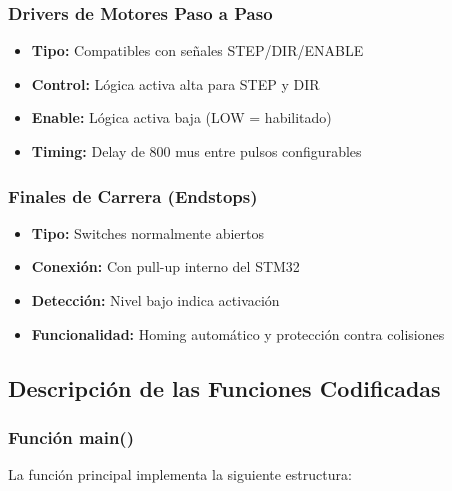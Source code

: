 \documentclass[12pt]{article}
\begin{document}
\subsubsection{Drivers de Motores Paso a Paso}
\begin{itemize}
    \item \textbf{Tipo:} Compatibles con señales STEP/DIR/ENABLE
    \item \textbf{Control:} Lógica activa alta para STEP y DIR
    \item \textbf{Enable:} Lógica activa baja (LOW = habilitado)
    \item \textbf{Timing:} Delay de 800 mus entre pulsos configurables
\end{itemize}

\subsubsection{Finales de Carrera (Endstops)}
\begin{itemize}
    \item \textbf{Tipo:} Switches normalmente abiertos
    \item \textbf{Conexión:} Con pull-up interno del STM32
    \item \textbf{Detección:} Nivel bajo indica activación
    \item \textbf{Funcionalidad:} Homing automático y protección contra colisiones
\end{itemize}

\subsection{Descripción de las Funciones Codificadas}

\subsubsection{Función main()}

La función principal implementa la siguiente estructura:

    
    
    
\end{document}
